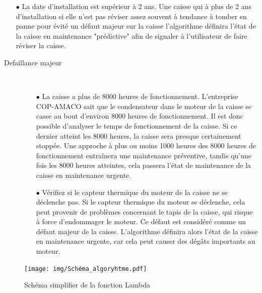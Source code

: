 \documentclass[12pt]{article}
\begin{document}
\begin{description}
\begin{itemize}
              \item[$\bullet$] La date d'installation est supérieur à 2 ans. Une caisse qui à plus de 2 ans d'installation si elle n'est pas réviser assez souvent à tendance à tomber en panne pour évité un défaut majeur sur la caisse l'algorithme définira l'état de la caisse en maintenance "prédictive" afin de signaler à l'utilisateur de faire réviser la caisse. 
        \end{itemize}

         
    
\end{description}

\begin{description}
    \item [Defaillance majeur ]
        \begin{itemize}
           \item[~]
            \item[$\bullet$] La caisse a plus de 8000 heures de fonctionnement. L'entreprise COP-AMACO sait que le condensateur dans le moteur de la caisse se casse au bout d'environ 8000 heures de fonctionnement. Il est donc possible d'analyser le temps de fonctionnement de la caisse. Si ce dernier atteint les 8000 heures, la caisse sera presque certainement stoppée. Une approche à plus ou moins 1000 heures des 8000 heures de fonctionnement entraînera une maintenance préventive, tandis qu'une fois les 8000 heures atteintes, cela passera l'état de maintenance de la caisse en maintenance urgente.
            
            \item[$\bullet$] Vérifiez si le capteur thermique du moteur de la caisse ne se déclenche pas. Si le capteur thermique du moteur se déclenche, cela peut provenir de problèmes concernant le tapis de la caisse, qui risque à force d'endommager le moteur. Ce défaut est considéré comme un défaut majeur de la caisse. L'algorithme définira alors l'état de la caisse en maintenance urgente, car cela peut causer des dégâts importants au moteur.
        \end{itemize}
\end{description}



\begin{figure}[H]
    \centering
    \texttt{[image: img/Schéma\_algoryhtme.pdf]}
    \caption{Schéma simplifier de la fonction Lambda}
    \label{fig:enter-label}
\end{figure}
\end{document}
